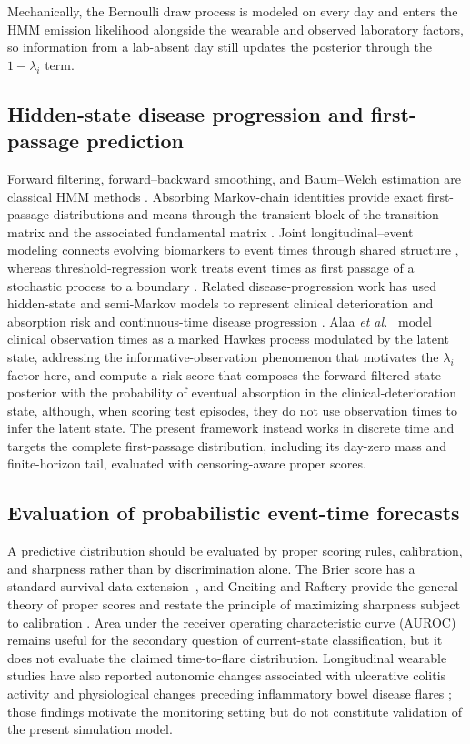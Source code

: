 \documentclass{ieeeaccess}
\begin{document}
Mechanically, the Bernoulli draw process is modeled on every day and enters the HMM emission likelihood alongside the wearable and observed laboratory factors, so information from a lab-absent day still updates the posterior through the $1-\lambda_i$ term.

\subsection{Hidden-state disease progression and first-passage prediction}\label{sec:hiddenstate}
Forward filtering, forward--backward smoothing, and Baum--Welch estimation are classical HMM methods \cite{rabiner,cappe}. Absorbing Markov-chain identities provide exact first-passage distributions and means through the transient block of the transition matrix and the associated fundamental matrix \cite{kemeny}. Joint longitudinal--event modeling connects evolving biomarkers to event times through shared structure \cite{tsiatis}, whereas threshold-regression work treats event times as first passage of a stochastic process to a boundary \cite{lee_whitmore}. Related disease-progression work has used hidden-state and semi-Markov models to represent clinical deterioration and absorption risk \cite{alaa} and continuous-time disease progression \cite{liu_cthmm}. Alaa \emph{et al.}~\cite{alaa} model clinical observation times as a marked Hawkes process modulated by the latent state, addressing the informative-observation phenomenon that motivates the $\lambda_i$ factor here, and compute a risk score that composes the forward-filtered state posterior with the probability of eventual absorption in the clinical-deterioration state, although, when scoring test episodes, they do not use observation times to infer the latent state. The present framework instead works in discrete time and targets the complete first-passage distribution, including its day-zero mass and finite-horizon tail, evaluated with censoring-aware proper scores.

\subsection{Evaluation of probabilistic event-time forecasts}
A predictive distribution should be evaluated by proper scoring rules, calibration, and sharpness rather than by discrimination alone. The Brier score has a standard survival-data extension~\cite{graf1999}, and Gneiting and Raftery provide the general theory of proper scores and restate the principle of maximizing sharpness subject to calibration \cite{gneiting2007}. Area under the receiver operating characteristic curve (AUROC) remains useful for the secondary question of current-state classification, but it does not evaluate the claimed time-to-flare distribution. Longitudinal wearable studies have also reported autonomic changes associated with ulcerative colitis activity \cite{hirten2021} and physiological changes preceding inflammatory bowel disease flares \cite{hirten2021,hirten2025}; those findings motivate the monitoring setting but do not constitute validation of the present simulation model.
\end{document}
